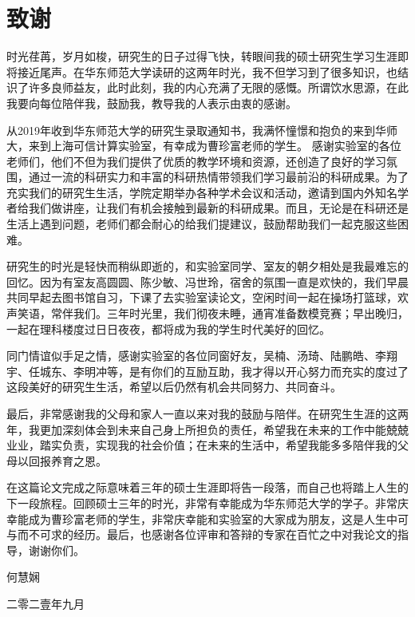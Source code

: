 {\fangsong
	\chapter*{致\qquad 谢}\vskip 2mm
	\vspace{-1cm}
		\large{

时光荏苒，岁月如梭，研究生的日子过得飞快，转眼间我的硕士研究生学习生涯即将接近尾声。在华东师范大学读研的这两年时光，我不但学习到了很多知识，也结识了许多良师益友，此时此刻，我的内心充满了无限的感慨。所谓饮水思源，在此我要向每位陪伴我，鼓励我，教导我的人表示由衷的感谢。

从2019年收到华东师范大学的研究生录取通知书，我满怀憧憬和抱负的来到华师大，来到上海可信计算实验室，有幸成为曹珍富老师的学生。
感谢实验室的各位老师们，他们不但为我们提供了优质的教学环境和资源，还创造了良好的学习氛围，通过一流的科研实力和丰富的科研热情带领我们学习最前沿的科研成果。为了充实我们的研究生生活，学院定期举办各种学术会议和活动，邀请到国内外知名学者给我们做讲座，让我们有机会接触到最新的科研成果。而且，无论是在科研还是生活上遇到问题，老师们都会耐心的给我们提建议，鼓励帮助我们一起克服这些困难。

研究生的时光是轻快而稍纵即逝的，和实验室同学、室友的朝夕相处是我最难忘的回忆。因为有室友高圆圆、陈少敏、冯世玲，宿舍的氛围一直是欢快的，我们早晨共同早起去图书馆自习，下课了去实验室读论文，空闲时间一起在操场打篮球，欢声笑语，常伴我们。三年时光里，我们彻夜未睡，通宵准备数模竞赛；早出晚归，一起在理科楼度过日日夜夜，都将成为我的学生时代美好的回忆。

同门情谊似手足之情，感谢实验室的各位同窗好友，吴楠、汤琦、陆鹏皓、李翔宇、任城东、李明冲等，是有你们的互励互助，我才得以开心努力而充实的度过了这段美好的研究生生活，希望以后仍然有机会共同努力、共同奋斗。

最后，非常感谢我的父母和家人一直以来对我的鼓励与陪伴。在研究生生涯的这两年，我更加深刻体会到未来自己身上所担负的责任，希望我在未来的工作中能兢兢业业，踏实负责，实现我的社会价值；在未来的生活中，希望我能多多陪伴我的父母以回报养育之恩。 

在这篇论文完成之际意味着三年的硕士生涯即将告一段落，而自己也将踏上人生的下一段旅程。回顾硕士三年的时光，非常有幸能成为华东师范大学的学子。非常庆幸能成为曹珍富老师的学生，非常庆幸能和实验室的大家成为朋友，这是人生中可与而不可求的经历。最后，也感谢各位评审和答辩的专家在百忙之中对我论文的指导，谢谢你们。
	}
	
	\vspace{0.2cm}
	
	\vspace{0.2cm} \hspace{9.8cm}
	何慧娴
	
	\hspace{9cm}  二零二壹年九月

} 